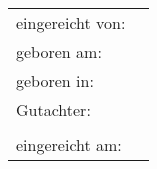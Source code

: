 {\begin{titlepage}
		\vfill
{}
		{\large \raggedleft
			\begin{tabularx}{\textwidth}{l@{\,\,\raggedright~}L} %
				eingereicht von: & \@titelAutor\\
				geboren am: & {\@titelGeburtsdatum}\\
				geboren in: & \@titelGeburtsort
				\vspace{0.5\baselineskip}\\
				Gutachter: & \@titelGutachterA \\
					& \@titelGutachterB
				\vspace{0.5\baselineskip}\\
				eingereicht am: & \@titelEinreichungsdatum \hfill \@titelVerteidigungsdatum
			\end{tabularx}}
			\vspace{-1\baselineskip}\\\phantom{x} %
		\setlength{\parindent}{\parindentbak}
		\setlength{\parskip}{\parskipbak}
	\end{titlepage}

	\let\@titelTitel\undefined
	\let\titel\undefined
	\let\@titelArbeit\undefined
	\let\typ\undefined
	\let\@titelGrad\undefined
	\let\grad\undefined
	\let\@titelAutor\undefined
	\let\autor\undefined
	\let\@titelGeburtsdatum\undefined
	\let\gebdatum\undefined
	\let\@titelGeburtsort\undefined
	\let\gebort\undefined
	\let\@titelGutachterA\undefined
	\let\@titelGutachterB\undefined
	\let\gutachter\undefined
	\let\@titelEinreichungsdatum\undefined
	\let\einreichungsdatum\undefined
	\let\@titelVerteidigungsdatum\undefined
	\let\verteidigungsdatum\undefined

	\KOMAoptions{\@wastwoside}%
	\let\@wastwoside\undefined
	\cleardoublepage %
}


